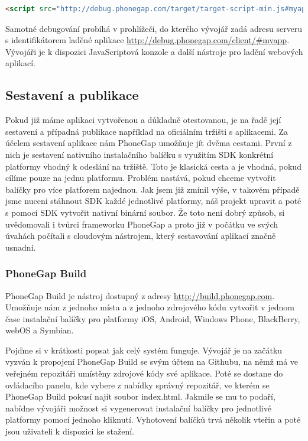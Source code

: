 \begin{lstlisting}[language=HTML,breaklines=true]
<script src="http://debug.phonegap.com/target/target-script-min.js#myapp"></script>
\end{lstlisting}

Samotné debugování probíhá v prohlížeči, do kterého vývojář zadá adresu serveru s identifikátorem laděné aplikace \url{http://debug.phonegap.com/client/\#myapp}. Vývojáři je k dispozici JavaScriptová konzole a další nástroje pro ladění webových aplikací.

\subsection{Sestavení a publikace}
Pokud již máme aplikaci vytvořenou a důkladně otestovanou, je na řadě její sestavení a případná publikace například na oficiálním tržišti s aplikacemi. Za účelem sestavení aplikace nám PhoneGap umožňuje jít dvěma cestami. První z nich je sestavení nativního instalačního balíčku s využitím SDK konkrétní platformy vhodný k odeslání na tržiště. Toto je klasická cesta a je vhodná, pokud cílíme pouze na jednu platformu. Problém nastává, pokud chceme vytvořit balíčky pro více platforem najednou. Jak jsem již zmínil výše, v takovém případě jsme nuceni stáhnout SDK každé jednotlivé platformy, náš projekt upravit a poté s pomocí SDK vytvořit nativní binární soubor. Že toto není dobrý způsob, si uvědomovali i tvůrci frameworku PhoneGap a proto již v počátku ve svých úvahách počítali s cloudovým nástrojem, který sestavování aplikací značně usnadní.

\subsubsection{PhoneGap Build} \label{Sec:PhoneGapBuild}
PhoneGap Build je nástroj dostupný z adresy \url{http://build.phonegap.com}. Umožňuje nám z jednoho místa a z jednoho zdrojového kódu vytvořit v jednom čase instalační balíčky pro platformy iOS, Android, Windows Phone, BlackBerry, webOS a Symbian.

Pojďme si v krátkosti popsat jak celý systém funguje. Vývojář je na začátku vyzván k propojení PhoneGap Build se svým účtem na Githubu, na němž má ve veřejném repozitáři umístěny zdrojové kódy své aplikace. Poté se dostane do ovládacího panelu, kde vybere z nabídky správný repozitář, ve kterém se PhoneGap Build pokusí najít soubor index.html. Jakmile se mu to podaří, nabídne vývojáři možnost si vygenerovat instalační balíčky pro jednotlivé platformy pomocí jednoho kliknutí. Vyhotovení balíčků trvá několik vteřin a poté jsou uživateli k dispozici ke stažení.


